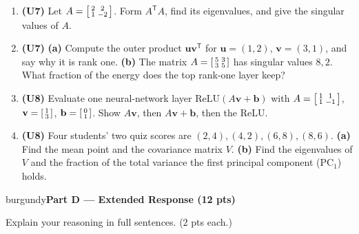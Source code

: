 \documentclass[10pt]{article}
\newcommand{\vv}{\mathbf{v}}
\newcommand{\bb}{\mathbf{b}}
\newcommand{\uu}{\mathbf{u}}
\newcommand{\relu}{\mathrm{ReLU}}
\newcommand{\T}{\mathsf{T}}
\newcommand{\parthead}[1]{%
  \vspace{6pt}\noindent
  \begin{headlinebox}{burgundy}{\color{white}\bfseries #1}\end{headlinebox}%
  \vspace{4pt}}
\begin{document}
\begin{enumerate}[leftmargin=1.9em, itemsep=10pt]
  \item \textbf{(U7)} Let $A=\begin{bsmallmatrix}2&2\\1&-2\end{bsmallmatrix}$. Form $A^\T A$, find its eigenvalues,
        and give the singular values of $A$.
        \vspace{2.6cm}
  \item \textbf{(U7)} \textbf{(a)} Compute the outer product $\uu\vv^\T$ for $\uu=(1,2)$, $\vv=(3,1)$, and say why it is
        rank one. \textbf{(b)} The matrix $A=\begin{bsmallmatrix}5&3\\3&5\end{bsmallmatrix}$ has singular values $8,2$.
        What fraction of the energy does the top rank-one layer keep?
        \vspace{2.4cm}
  \item \textbf{(U8)} Evaluate one neural-network layer $\relu(A\vv+\bb)$ with
        $A=\begin{bsmallmatrix}1&1\\1&-1\end{bsmallmatrix}$, $\vv=\begin{bsmallmatrix}1\\3\end{bsmallmatrix}$,
        $\bb=\begin{bsmallmatrix}0\\1\end{bsmallmatrix}$. Show $A\vv$, then $A\vv+\bb$, then the ReLU.
        \vspace{2.4cm}
  \item \textbf{(U8)} Four students' two quiz scores are $(2,4),(4,2),(6,8),(8,6)$.
        \textbf{(a)} Find the mean point and the covariance matrix $V$.
        \textbf{(b)} Find the eigenvalues of $V$ and the fraction of the total variance the first principal
        component ($\mathrm{PC}_1$) holds.
        \vspace{2.8cm}
\end{enumerate}

\parthead{Part D --- Extended Response (12 pts)}
Explain your reasoning in full sentences. ($2$ pts each.)
\end{document}
